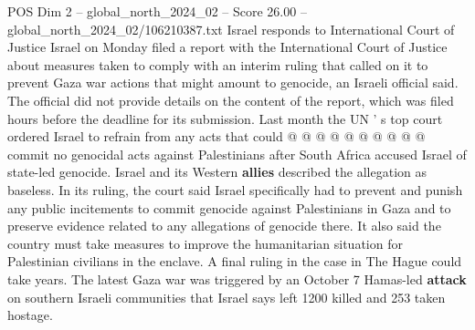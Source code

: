 \begin{textsample}{POS Dim 2 – global\_north\_2024\_02 – Score 26.00 – global\_north\_2024\_02/106210387.txt}
Israel responds to International Court of Justice Israel on Monday filed a report with the International Court of Justice about measures taken to comply with an interim ruling that called on it to prevent Gaza war actions that might amount to genocide, an Israeli official said.
The official did not provide details on the content of the report, which was filed hours before the deadline for its submission.
Last month the UN ' s top court ordered Israel to refrain from any acts that could @ @ @ @ @ @ @ @ @ @ commit no genocidal acts against Palestinians after South Africa accused Israel of state-led genocide.
Israel and its Western \textbf{allies} described the allegation as baseless.
In its ruling, the court said Israel specifically had to prevent and punish any public incitements to commit genocide against Palestinians in Gaza and to preserve evidence related to any allegations of genocide there.
It also said the country must take measures to improve the humanitarian situation for Palestinian civilians in the enclave.
A final ruling in the case in The Hague could take years.
The latest Gaza war was triggered by an October 7 Hamas-led \textbf{attack} on southern Israeli communities that Israel says left 1200 killed and 253 taken hostage.

\end{textsample}
